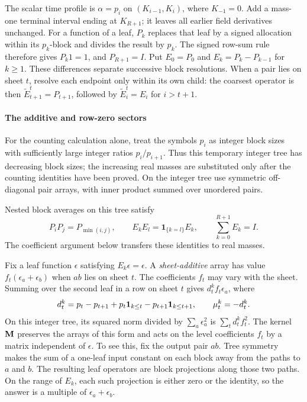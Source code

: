 The scalar time profile is \(\alpha=p_i\) on \((K_{i-1},K_i)\), where
\(K_{-1}=0\). Add a mass-one terminal interval ending at
\(K_{R+1}\); it leaves all earlier field derivatives unchanged.
For a function of a leaf, \(P_k\) replaces that leaf by a signed
allocation within its \(p_k\)-block and divides the result by \(p_k\).
The signed row-sum rule therefore gives \(P_k1=1\), and
\(P_{R+1}=I\). Put
\(E_0=P_0\) and \(E_k=P_k-P_{k-1}\) for \(k\ge1\).
These differences separate successive block resolutions. When a pair
lies on sheet \(t\), resolve each endpoint only within its own child:
the coarsest operator is then
\(\widetilde E^t_{t+1}=P_{t+1}\), followed by
\(\widetilde E^t_i=E_i\) for \(i>t+1\).

\paragraph{The additive and row-zero sectors}
For the counting calculation alone, treat the symbols \(p_i\) as integer
block sizes with sufficiently large integer ratios \(p_i/p_{i+1}\).
Thus this temporary integer tree has decreasing block sizes; the
increasing real masses are substituted only after the counting
identities have been proved. On the integer tree use symmetric
off-diagonal pair arrays, with inner product summed over unordered
pairs.

Nested block averages on this tree satisfy
\[
 P_iP_j=P_{\min(i,j)},\qquad
 E_kE_l=\mathbf1_{\{k=l\}}E_k,\qquad \sum_{k=0}^{R+1}E_k=I.
\]
The coefficient argument below transfers these identities to real masses.

Fix a leaf function \(\epsilon\) satisfying \(E_k\epsilon=\epsilon\).
A \emph{sheet-additive} array has value
\(f_t(\epsilon_a+\epsilon_b)\) when \(ab\) lies on sheet \(t\).
The coefficients \(f_t\) may vary with the sheet. Summing over the
second leaf in a row on sheet \(t\) gives
\(d_t^k f_t\epsilon_a\), where
\[
 d_t^k=p_t-p_{t+1}+p_t{\bf1}_{k\le t}-p_{t+1}{\bf1}_{k\le t+1},\qquad \mu_t^k=-d_t^k .
\]
On this integer tree, its squared norm divided by
\(\sum_a\epsilon_a^2\) is \(\sum_t d_t^k f_t^2\).
The kernel \({\bf M}\) preserves the arrays of this form and acts on
the level coefficients \(f_t\) by a matrix independent of
\(\epsilon\). To see this, fix the output pair \(ab\). Tree symmetry
makes the sum of a one-leaf input constant on each block away from the
paths to \(a\) and \(b\). The resulting leaf operators are block
projections along those two paths. On the range of \(E_k\), each such
projection is either zero or the identity, so the answer is a multiple
of \(\epsilon_a+\epsilon_b\).

